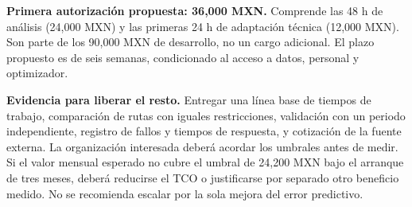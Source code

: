 \documentclass[letterpaper,11pt]{article}
\begin{document}
\textbf{Primera autorización propuesta: 36,000 MXN.} Comprende las 48 h de análisis (24,000 MXN) y las primeras 24 h de adaptación técnica (12,000 MXN). Son parte de los 90,000 MXN de desarrollo, no un cargo adicional. El plazo propuesto es de seis semanas, condicionado al acceso a datos, personal y optimizador.

\textbf{Evidencia para liberar el resto.} Entregar una línea base de tiempos de trabajo, comparación de rutas con iguales restricciones, validación con un periodo independiente, registro de fallos y tiempos de respuesta, y cotización de la fuente externa. La organización interesada deberá acordar los umbrales antes de medir. Si el valor mensual esperado no cubre el umbral de 24,200 MXN bajo el arranque de tres meses, deberá reducirse el TCO o justificarse por separado otro beneficio medido. No se recomienda escalar por la sola mejora del error predictivo.
\end{document}
